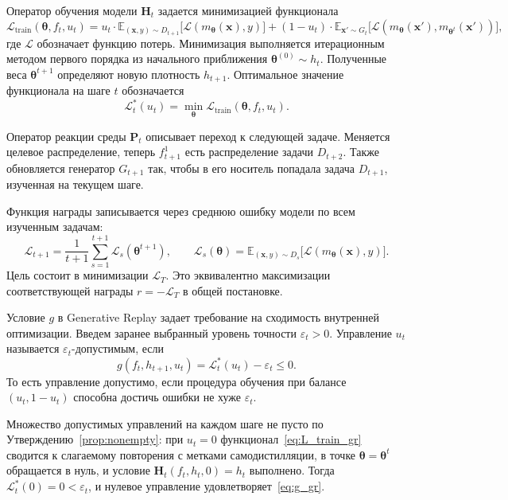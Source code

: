 \documentclass[a4paper,14pt,oneside,openany]{extarticle}
\newcommand{\bH}{\mathbf{H}}
\newcommand{\bP}{\mathbf{P}}
\newcommand{\bx}{\mathbf{x}}
\newcommand{\cL}{\mathcal{L}}
\newcommand{\bbE}{\mathbb{E}}
\newcommand{\btheta}{\boldsymbol{\theta}}
\begin{document}
Оператор обучения модели $\bH_t$ задается минимизацией функционала
\begin{equation}
    \cL_{\text{train}}(\btheta, f_t, u_t) = u_t \cdot \bbE_{(\bx, y) \sim D_{t+1}}\bigl[\cL(m_{\btheta}(\bx), y)\bigr] + (1 - u_t) \cdot \bbE_{\bx' \sim G_t}\bigl[\cL(m_{\btheta}(\bx'), m_{\btheta^t}(\bx'))\bigr],
    \label{eq:L_train_gr}
\end{equation}
где $\cL$ обозначает функцию потерь. Минимизация выполняется итерационным методом первого порядка из начального приближения $\btheta^{(0)} \sim h_t$. Полученные веса $\btheta^{t+1}$ определяют новую плотность $h_{t+1}$. Оптимальное значение функционала на шаге $t$ обозначается
\begin{equation}
    \cL^*_t(u_t) = \min_{\btheta} \cL_{\text{train}}(\btheta, f_t, u_t).
    \label{eq:L_star_gr}
\end{equation}

Оператор реакции среды $\bP_t$ описывает переход к следующей задаче. Меняется целевое распределение, теперь $f_{t+1}^1$ есть распределение задачи $D_{t+2}$. Также обновляется генератор $G_{t+1}$ так, чтобы в его носитель попадала задача $D_{t+1}$, изученная на текущем шаге.

Функция награды записывается через среднюю ошибку модели по всем изученным задачам:
\begin{equation}
    \cL_{t+1} = \frac{1}{t+1}\sum_{s=1}^{t+1} \cL_s(\btheta^{t+1}), \qquad \cL_s(\btheta) = \bbE_{(\bx, y) \sim D_s}\bigl[\cL(m_{\btheta}(\bx), y)\bigr].
    \label{eq:L_bar_gr}
\end{equation}
Цель состоит в минимизации $\cL_T$. Это эквивалентно максимизации соответствующей награды $r = -\cL_T$ в общей постановке.

Условие $g$ в Generative Replay задает требование на сходимость внутренней оптимизации. Введем заранее выбранный уровень точности $\varepsilon_t > 0$. Управление $u_t$ называется $\varepsilon_t$-допустимым, если
\begin{equation}
    g(f_t, h_{t+1}, u_t) = \cL^*_t(u_t) - \varepsilon_t \le 0.
    \label{eq:g_gr}
\end{equation}
То есть управление допустимо, если процедура обучения при балансе $(u_t, 1 - u_t)$ способна достичь ошибки не хуже $\varepsilon_t$.

Множество допустимых управлений на каждом шаге не пусто по Утверждению~\ref{prop:nonempty}: при $u_t = 0$ функционал~\eqref{eq:L_train_gr} сводится к слагаемому повторения с метками самодистилляции, в точке $\btheta = \btheta^t$ обращается в нуль, и условие $\bH_t(f_t, h_t, 0) = h_t$ выполнено. Тогда $\cL^*_t(0) = 0 < \varepsilon_t$, и нулевое управление удовлетворяет~\eqref{eq:g_gr}.
\end{document}
